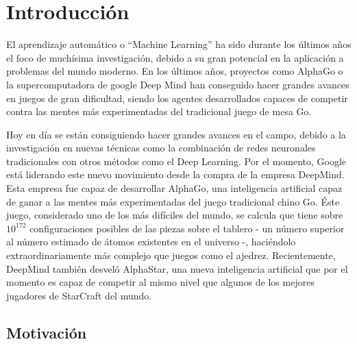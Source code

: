 \documentclass[11pt,spanish,listoffigures,listoftables]{tfgetsinf}
\begin{document}

\mainmatter


\chapter{Introducción}

El aprendizaje automático o “Machine Learning” ha sido durante los últimos años el foco de muchísima investigación, debido a su gran potencial en la aplicación a problemas del mundo moderno. En los últimos años, proyectos como AlphaGo o la supercomputadora de google Deep Mind han conseguido hacer grandes avances en juegos de gran dificultad, siendo los agentes desarrollados capaces de competir contra las mentes más experimentadas del tradicional juego de mesa Go. 

Hoy en día se están consiguiendo hacer grandes avances en el campo, debido a la investigación en nuevas técnicas como la combinación de redes neuronales tradicionales con otros métodos como el Deep Learning. Por el momento, Google está liderando este nuevo movimiento desde la compra de la empresa DeepMind. Esta empresa fue capaz de desarrollar AlphaGo, una inteligencia artificial capaz de ganar a las mentes más experimentadas del juego tradicional chino Go. Éste juego, considerado uno de los más difíciles del mundo, se calcula que tiene sobre $10^{172}$ configuraciones posibles de las piezas sobre el tablero - un número superior al número estimado de átomos existentes en el universo -, haciéndolo extraordinariamente más complejo que juegos como el ajedrez. Recientemente, DeepMind también desveló AlphaStar, una nueva inteligencia artificial que por el momento es capaz de competir al mismo nivel que algunos de los mejores jugadores de StarCraft del mundo.




\section{Motivaci\'on}
\end{document}
